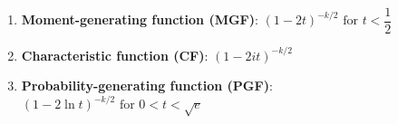 \begin{enumerate}


    \item \textbf{Moment-generating function (MGF)}: $  {\displaystyle (1-2t)^{-k/2}{\text{ for }}t<{\dfrac {1}{2}}\;} $
    \hfill \cite{wiki/Chi-squared_distribution}

    \item \textbf{Characteristic function (CF)}:
    $  {\displaystyle (1-2it)^{-k/2}} $
    \hfill \cite{wiki/Chi-squared_distribution}

    \item \textbf{Probability-generating function (PGF)}: $  {\displaystyle (1-2\ln t)^{-k/2}{\text{ for }}0<t<{\sqrt {e}}\;} $
    \hfill \cite{wiki/Chi-squared_distribution}


\end{enumerate}











